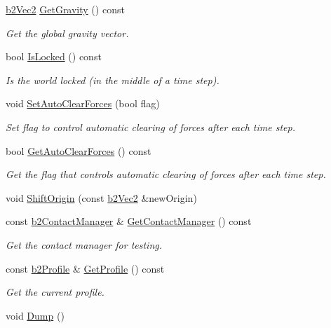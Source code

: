 \begin{DoxyCompactItemize}
\hyperlink{structb2Vec2}{b2\+Vec2} \hyperlink{classb2World_abd41cdde8eaa3d1c58d2f00eaf688ec3}{Get\+Gravity} () const
\begin{DoxyCompactList}\small\item\em Get the global gravity vector. \end{DoxyCompactList}\item 
\mbox{\label{classb2World_a71ca09a3082945a7e77f3f39fb021237}} 
bool \hyperlink{classb2World_a71ca09a3082945a7e77f3f39fb021237}{Is\+Locked} () const
\begin{DoxyCompactList}\small\item\em Is the world locked (in the middle of a time step). \end{DoxyCompactList}\item 
\mbox{\label{classb2World_aa2bced28ddef5bbb00ed5666e5e9f620}} 
void \hyperlink{classb2World_aa2bced28ddef5bbb00ed5666e5e9f620}{Set\+Auto\+Clear\+Forces} (bool flag)
\begin{DoxyCompactList}\small\item\em Set flag to control automatic clearing of forces after each time step. \end{DoxyCompactList}\item 
\mbox{\label{classb2World_ae1fa8272edf37a4e2a7be08f6e0a8cc6}} 
bool \hyperlink{classb2World_ae1fa8272edf37a4e2a7be08f6e0a8cc6}{Get\+Auto\+Clear\+Forces} () const
\begin{DoxyCompactList}\small\item\em Get the flag that controls automatic clearing of forces after each time step. \end{DoxyCompactList}\item 
void \hyperlink{classb2World_afc33e20e64252c5be115216051408047}{Shift\+Origin} (const \hyperlink{structb2Vec2}{b2\+Vec2} \&new\+Origin)
\item 
\mbox{\label{classb2World_aa65ad7170b0648a29d4d3d0c5afbd546}} 
const \hyperlink{classb2ContactManager}{b2\+Contact\+Manager} \& \hyperlink{classb2World_aa65ad7170b0648a29d4d3d0c5afbd546}{Get\+Contact\+Manager} () const
\begin{DoxyCompactList}\small\item\em Get the contact manager for testing. \end{DoxyCompactList}\item 
\mbox{\label{classb2World_abbe7bff11d5694bb22848b115ed1e90a}} 
const \hyperlink{structb2Profile}{b2\+Profile} \& \hyperlink{classb2World_abbe7bff11d5694bb22848b115ed1e90a}{Get\+Profile} () const
\begin{DoxyCompactList}\small\item\em Get the current profile. \end{DoxyCompactList}\item 
void \hyperlink{classb2World_a73c1fec260d460514edd335d4c235893}{Dump} ()
\end{DoxyCompactItemize}
